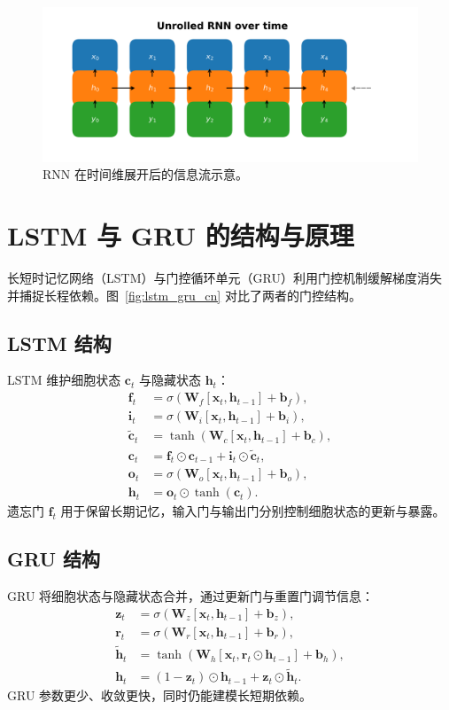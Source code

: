 ﻿\documentclass[UTF8,zihao=-4]{ctexart}
\begin{document}
\begin{figure}[H]
  \centering
  \includegraphics[width=0.85\linewidth]{rnn_unrolled_dynamics.png}
  \caption{RNN 在时间维展开后的信息流示意。}
  \label{fig:rnn_unrolled_cn}
\end{figure}
\FloatBarrier

\section{LSTM 与 GRU 的结构与原理}
长短时记忆网络（LSTM）与门控循环单元（GRU）利用门控机制缓解梯度消失并捕捉长程依赖。图~\ref{fig:lstm_gru_cn} 对比了两者的门控结构。

\subsection{LSTM 结构}
LSTM 维护细胞状态 $\mathbf{c}_t$ 与隐藏状态 $\mathbf{h}_t$：
\begin{align}
  \mathbf{f}_t &= \sigma(\mathbf{W}_f [\mathbf{x}_t, \mathbf{h}_{t-1}] + \mathbf{b}_f), \\
  \mathbf{i}_t &= \sigma(\mathbf{W}_i [\mathbf{x}_t, \mathbf{h}_{t-1}] + \mathbf{b}_i), \\
  \tilde{\mathbf{c}}_t &= \tanh(\mathbf{W}_c [\mathbf{x}_t, \mathbf{h}_{t-1}] + \mathbf{b}_c), \\
  \mathbf{c}_t &= \mathbf{f}_t \odot \mathbf{c}_{t-1} + \mathbf{i}_t \odot \tilde{\mathbf{c}}_t, \\
  \mathbf{o}_t &= \sigma(\mathbf{W}_o [\mathbf{x}_t, \mathbf{h}_{t-1}] + \mathbf{b}_o), \\
  \mathbf{h}_t &= \mathbf{o}_t \odot \tanh(\mathbf{c}_t).
\end{align}
遗忘门 $\mathbf{f}_t$ 用于保留长期记忆，输入门与输出门分别控制细胞状态的更新与暴露。

\subsection{GRU 结构}
GRU 将细胞状态与隐藏状态合并，通过更新门与重置门调节信息：
\begin{align}
  \mathbf{z}_t &= \sigma(\mathbf{W}_z [\mathbf{x}_t, \mathbf{h}_{t-1}] + \mathbf{b}_z), \\
  \mathbf{r}_t &= \sigma(\mathbf{W}_r [\mathbf{x}_t, \mathbf{h}_{t-1}] + \mathbf{b}_r), \\
  \tilde{\mathbf{h}}_t &= \tanh(\mathbf{W}_h [\mathbf{x}_t, \mathbf{r}_t \odot \mathbf{h}_{t-1}] + \mathbf{b}_h), \\
  \mathbf{h}_t &= (1 - \mathbf{z}_t) \odot \mathbf{h}_{t-1} + \mathbf{z}_t \odot \tilde{\mathbf{h}}_t.
\end{align}
GRU 参数更少、收敛更快，同时仍能建模长短期依赖。
\end{document}
